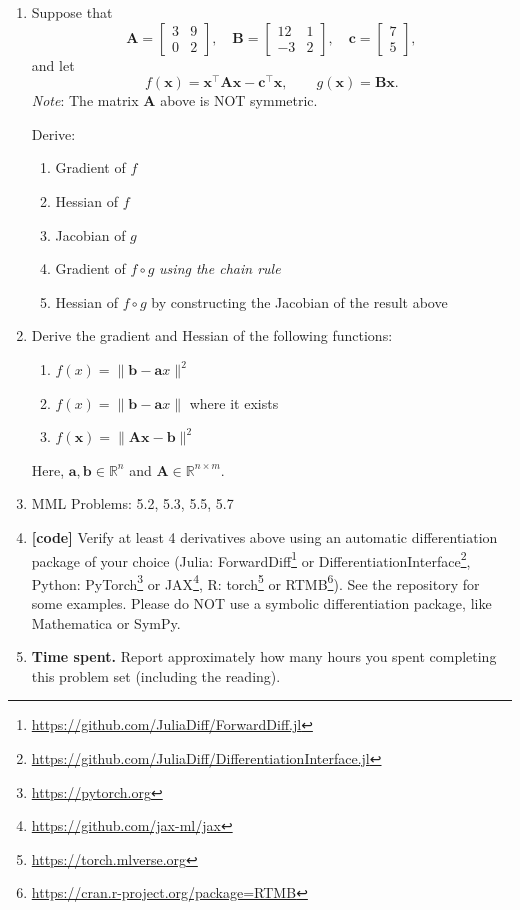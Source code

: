 \documentclass[letterpaper]{article}
\newcommand{\Real}{\mathbb{R}}
\newcommand{\tr}{^\top}
\begin{document}
\begin{enumerate}

\item Suppose that
  \[
    \bm{A} = \begin{bmatrix} 3 & 9 \\ 0 & 2 \end{bmatrix}, \quad
    \bm{B} = \begin{bmatrix} 12 & 1 \\ -3 & 2 \end{bmatrix}, \quad
    \bm{c} = \begin{bmatrix} 7 \\ 5 \end{bmatrix}, 
  \]
  and let
  \[
    f(\bm{x}) = \bm{x}\tr \bm{A} \bm{x} - \bm{c}\tr \bm{x},
    \qquad
    g(\bm{x}) = \bm{B} \bm{x}.
  \]
  \emph{Note}: The matrix $\bm{A}$ above is NOT symmetric.
  
  Derive:
  \begin{enumerate}
  \item Gradient of $f$
  \item Hessian of $f$
  \item Jacobian of $g$
  \item Gradient of $f \circ g$ \emph{using the chain rule}
  \item Hessian of $f \circ g$ by constructing the Jacobian of the result above
  \end{enumerate}
  
 \item Derive the gradient and Hessian of the following functions:
   \begin{enumerate}
   \item $f(x) = \| \bm{b} - \bm{a} x \|^2$
   \item $f(x) = \| \bm{b} - \bm{a} x \|$ where it exists
   \item $f(\bm{x}) = \| \bm{A}\bm{x} - \bm{b} \|^{2}$
   \end{enumerate}
   Here, $\bm{a}, \bm{b} \in \Real^n$ and $\bm{A} \in \Real^{n \times m}$.
   
\item MML Problems: 5.2, 5.3, 5.5, 5.7 
  
\item \textbf{[code]} Verify at least 4 derivatives above using an automatic differentiation package of your choice (Julia: ForwardDiff\footnote{\url{https://github.com/JuliaDiff/ForwardDiff.jl}} or DifferentiationInterface\footnote{\url{https://github.com/JuliaDiff/DifferentiationInterface.jl}}, Python: PyTorch\footnote{\url{https://pytorch.org}} or JAX\footnote{\url{https://github.com/jax-ml/jax}}, R: torch\footnote{\url{https://torch.mlverse.org}} or RTMB\footnote{\url{https://cran.r-project.org/package=RTMB}}). See the repository for some examples. Please do NOT use a symbolic differentiation package, like Mathematica or SymPy. 
  
\item \textbf{Time spent.} Report approximately how many hours you spent completing this problem set (including the reading).
\end{enumerate}
\end{document}

